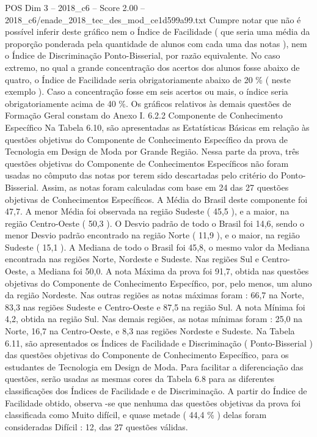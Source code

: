 \begin{textsample}{POS Dim 3 – 2018\_c6 – Score 2.00 – 2018\_c6/enade\_2018\_tec\_des\_mod\_ce1d599a99.txt}
Cumpre notar que não é possível inferir deste gráfico nem o Índice de Facilidade ( que seria uma média da proporção ponderada pela quantidade de alunos com cada uma das notas ), nem o Índice de Discriminação Ponto-Bisserial, por razão equivalente.
No caso extremo, no qual a grande concentração dos acertos dos alunos fosse abaixo de quatro, o Índice de Facilidade seria obrigatoriamente abaixo de 20 \% ( neste exemplo ).
Caso a concentração fosse em seis acertos ou mais, o índice seria obrigatoriamente acima de 40 \%.
Os gráficos relativos às demais questões de Formação Geral constam do Anexo I. 6.2.2 Componente de Conhecimento Específico Na Tabela 6.10, são apresentadas as Estatísticas Básicas em relação às questões objetivas do Componente de Conhecimento Específico da prova de Tecnologia em Design de Moda por Grande Região.
Nessa parte da prova, três questões objetivas do Componente de Conhecimentos Específicos não foram usadas no cômputo das notas por terem sido descartadas pelo critério do Ponto-Bisserial.
Assim, as notas foram calculadas com base em 24 das 27 questões objetivas de Conhecimentos Específicos.
A Média do Brasil deste componente foi 47,7.
A menor Média foi observada na região Sudeste ( 45,5 ), e a maior, na região Centro-Oeste ( 50,3 ).
O Desvio padrão de todo o Brasil foi 14,6, sendo o menor Desvio padrão encontrado na região Norte ( 11,9 ), e o maior, na região Sudeste ( 15,1 ).
A Mediana de todo o Brasil foi 45,8, o mesmo valor da Mediana encontrada nas regiões Norte, Nordeste e Sudeste.
Nas regiões Sul e Centro-Oeste, a Mediana foi 50,0.
A nota Máxima da prova foi 91,7, obtida nas questões objetivas do Componente de Conhecimento Específico, por, pelo menos, um aluno da região Nordeste.
Nas outras regiões as notas máximas foram : 66,7 na Norte, 83,3 nas regiões Sudeste e Centro-Oeste e 87,5 na região Sul.
A nota Mínima foi 4,2, obtida na região Sul.
Nas demais regiões, as notas mínimas foram : 25,0 na Norte, 16,7 na Centro-Oeste, e 8,3 nas regiões Nordeste e Sudeste.
Na Tabela 6.11, são apresentados os Índices de Facilidade e Discriminação ( Ponto-Bisserial ) das questões objetivas do Componente de Conhecimento Específico, para os estudantes de Tecnologia em Design de Moda.
Para facilitar a diferenciação das questões, serão usadas as mesmas cores da Tabela 6.8 para as diferentes classificações dos Índices de Facilidade e de Discriminação.
A partir do Índice de Facilidade obtido, observa -se que nenhuma das questões objetivas da prova foi classificada como Muito difícil, e quase metade ( 44,4 \% ) delas foram consideradas Difícil : 12, das 27 questões válidas.

\end{textsample}

